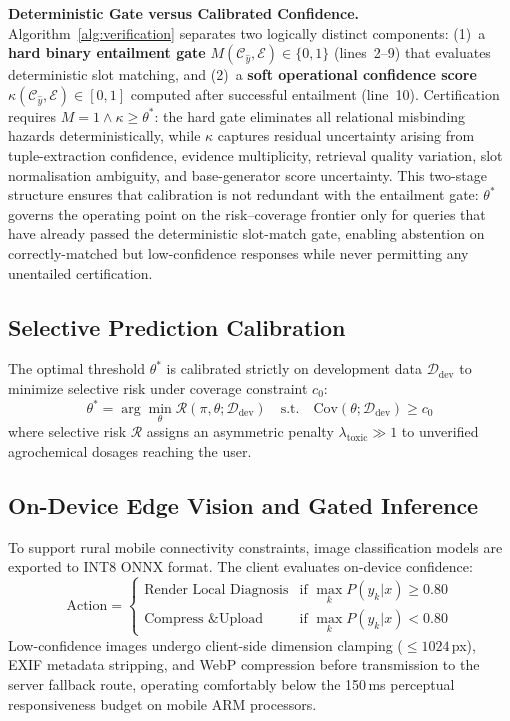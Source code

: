 \documentclass[11pt,a4paper]{article}
\begin{document}
\noindent\textbf{Deterministic Gate versus Calibrated Confidence.}\label{para:gate_vs_kappa} Algorithm~\ref{alg:verification} separates two logically distinct components: (1)~a \textbf{hard binary entailment gate} $M(\mathcal{C}_{\hat{y}}, \mathcal{E}) \in \{0,1\}$ (lines~2--9) that evaluates deterministic slot matching, and (2)~a \textbf{soft operational confidence score} $\kappa(\mathcal{C}_{\hat{y}}, \mathcal{E}) \in [0,1]$ computed after successful entailment (line~10). Certification requires $M = 1 \land \kappa \ge \theta^*$: the hard gate eliminates all relational misbinding hazards deterministically, while $\kappa$ captures residual uncertainty arising from tuple-extraction confidence, evidence multiplicity, retrieval quality variation, slot normalisation ambiguity, and base-generator score uncertainty. This two-stage structure ensures that calibration is not redundant with the entailment gate: $\theta^*$ governs the operating point on the risk--coverage frontier only for queries that have already passed the deterministic slot-match gate, enabling abstention on correctly-matched but low-confidence responses while never permitting any unentailed certification.

\subsection{Selective Prediction Calibration}
The optimal threshold $\theta^*$ is calibrated strictly on development data $\mathcal{D}_{\text{dev}}$ to minimize selective risk under coverage constraint $c_0$:
\begin{equation}
    \theta^* = \arg\min_{\theta} \mathcal{R}(\pi, \theta; \mathcal{D}_{\text{dev}}) \quad \text{s.t.} \quad \text{Cov}(\theta; \mathcal{D}_{\text{dev}}) \ge c_0
\end{equation}
where selective risk $\mathcal{R}$ assigns an asymmetric penalty $\lambda_{\text{toxic}} \gg 1$ to unverified agrochemical dosages reaching the user.

\subsection{On-Device Edge Vision and Gated Inference}
To support rural mobile connectivity constraints, image classification models are exported to INT8 ONNX format. The client evaluates on-device confidence:
\begin{equation}
    \text{Action} = \begin{cases}
        \text{Render Local Diagnosis} & \text{if } \max_k P(y_k | x) \ge 0.80 \\
        \text{Compress \& Upload} & \text{if } \max_k P(y_k | x) < 0.80
    \end{cases}
\end{equation}
Low-confidence images undergo client-side dimension clamping ($\le 1024$\,px), EXIF metadata stripping, and WebP compression before transmission to the server fallback route, operating comfortably below the 150\,ms perceptual responsiveness budget on mobile ARM processors.
\end{document}
